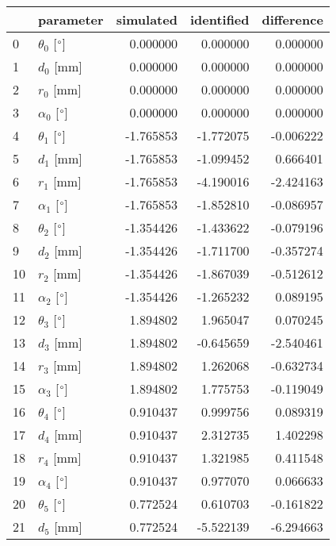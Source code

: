 \documentclass{standalone}%
\begin{document}
%
\normalsize%
\begin{tabular}{llrrr}
\toprule
{} &                 parameter & simulated & identified & difference \\
\midrule
0  &  $\theta_{0}$ [$\degree$] &  0.000000 &   0.000000 &   0.000000 \\
1  &              $d_{0}$ [mm] &  0.000000 &   0.000000 &   0.000000 \\
2  &              $r_{0}$ [mm] &  0.000000 &   0.000000 &   0.000000 \\
3  &  $\alpha_{0}$ [$\degree$] &  0.000000 &   0.000000 &   0.000000 \\
4  &  $\theta_{1}$ [$\degree$] & -1.765853 &  -1.772075 &  -0.006222 \\
5  &              $d_{1}$ [mm] & -1.765853 &  -1.099452 &   0.666401 \\
6  &              $r_{1}$ [mm] & -1.765853 &  -4.190016 &  -2.424163 \\
7  &  $\alpha_{1}$ [$\degree$] & -1.765853 &  -1.852810 &  -0.086957 \\
8  &  $\theta_{2}$ [$\degree$] & -1.354426 &  -1.433622 &  -0.079196 \\
9  &              $d_{2}$ [mm] & -1.354426 &  -1.711700 &  -0.357274 \\
10 &              $r_{2}$ [mm] & -1.354426 &  -1.867039 &  -0.512612 \\
11 &  $\alpha_{2}$ [$\degree$] & -1.354426 &  -1.265232 &   0.089195 \\
12 &  $\theta_{3}$ [$\degree$] &  1.894802 &   1.965047 &   0.070245 \\
13 &              $d_{3}$ [mm] &  1.894802 &  -0.645659 &  -2.540461 \\
14 &              $r_{3}$ [mm] &  1.894802 &   1.262068 &  -0.632734 \\
15 &  $\alpha_{3}$ [$\degree$] &  1.894802 &   1.775753 &  -0.119049 \\
16 &  $\theta_{4}$ [$\degree$] &  0.910437 &   0.999756 &   0.089319 \\
17 &              $d_{4}$ [mm] &  0.910437 &   2.312735 &   1.402298 \\
18 &              $r_{4}$ [mm] &  0.910437 &   1.321985 &   0.411548 \\
19 &  $\alpha_{4}$ [$\degree$] &  0.910437 &   0.977070 &   0.066633 \\
20 &  $\theta_{5}$ [$\degree$] &  0.772524 &   0.610703 &  -0.161822 \\
21 &              $d_{5}$ [mm] &  0.772524 &  -5.522139 &  -6.294663 \\

\end{tabular}
\end{document}
